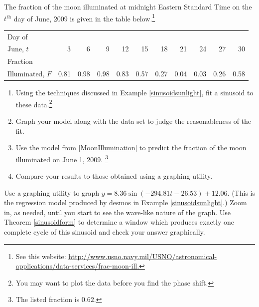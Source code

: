 \documentclass{ximera}
\begin{document}
\begin{problem}
The fraction of the moon illuminated at midnight Eastern Standard Time on the $t^{\text{th}}$ day of June, 2009 is given in the table below.\footnote{See this website: \href{http://www.usno.navy.mil/USNO/astronomical-applications/data-services/frac-moon-ill}{\underline{http://www.usno.navy.mil/USNO/astronomical-applications/data-services/frac-moon-ill}.}} 


\small

\noindent \begin{tabular}{|l|r|r|r|r|r|r|r|r|r|r|} \hline
Day of  & & & & & & & & & & \\
June, $t$ & 3 & 6 & 9 & 12 & 15 & 18 & 21 & 24 & 27 & 30\\ 
\hline 
Fraction  & & & & & & & & & & \\
Illuminated, $F$ & 0.81 & 0.98 & 0.98 & 0.83 & 0.57 & 0.27 & 0.04 & 0.03 & 0.26 & 0.58  \\ \hline
\end{tabular}

\normalsize



\begin{enumerate}

\item \label{MoonIllumination} Using the techniques discussed in Example \ref{sinusoidsunlight}, fit a sinusoid to these data.\footnote{You may want to plot the data before you find the phase shift.} 

\item  Graph your model along with the data set to judge the reasonableness of the fit.

\item Use the model from \ref{MoonIllumination} to predict the fraction of the moon illuminated on June 1, 2009. \footnote{The listed fraction is $0.62$.}

\item Compare your results to those obtained using a graphing utility.

\end{enumerate}

\end{problem}


\begin{problem} \label{graphdesmosregression}  
Use a graphing utility to graph $y = 8.36 \sin(-294.81t  - 26.53) + 12.06$.  (This is the regression model produced by desmos in Example \ref{sinusoidsunlight}.) Zoom in, as needed, until you start to see the wave-like nature of the graph.  Use Theorem \ref{sinusoidform} to determine a window which produces exactly one complete cycle of this sinusoid and check your answer graphically.
\end{problem}
\end{document}
